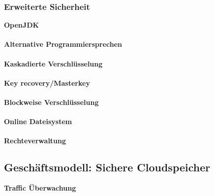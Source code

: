 \documentclass[12pt,a4paper,bibliography=totocnumbered,listof=totocnumbered]{scrartcl}
\begin{document}
\subsubsection{Erweiterte Sicherheit}
\textbf{OpenJDK}\\
\\\textbf{Alternative Programmiersprechen}\\
\\\textbf{Kaskadierte Verschlüsselung}\\
\\\textbf{Key recovery/Masterkey}\\
\\\textbf{Blockweise Verschlüsselung}\\
\\\textbf{Online Dateisystem}\\
\\\textbf{Rechteverwaltung}\\

\subsection{Geschäftsmodell: Sichere Cloudspeicher}
\textbf{Traffic Überwachung}\\
\pagebreak


	
 
\end{document}
